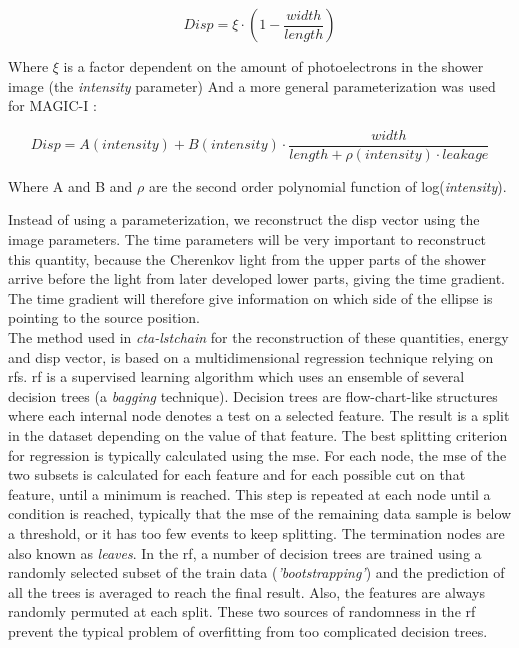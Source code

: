 \documentclass[main.tex]{subfiles}
\begin{document}
\begin{equation}
  Disp = \xi \cdot \left(1 - \frac{width}{length}  \right)
\end{equation}

Where $\xi$ is a factor dependent on the amount of photoelectrons in the shower image (the \textit{intensity} parameter)
And a more general parameterization was used for MAGIC-I \cite{2005DISPmagic}:

\begin{equation}
 Disp=A(intensity) + B(intensity) \cdot \frac{width}{length+\rho(intensity) \cdot leakage}  
\end{equation}

Where A and B and $\rho$ are the second order polynomial function of log(\textit{intensity}).

Instead of using a parameterization, we reconstruct the disp vector using the image parameters. The time parameters will be very important to reconstruct this quantity, because the Cherenkov light from the upper parts of the shower arrive before the light from later developed lower parts, giving the time gradient. The time gradient will therefore give information on which side of the ellipse is pointing to the source position.\\

The method used in \textit{cta-lstchain} for the reconstruction of these quantities, energy and disp vector, is based on a multidimensional regression technique relying on \glspl{rf}. \gls{rf} is a supervised learning algorithm which uses an ensemble of several decision trees (a \textit{bagging} technique). Decision trees are flow-chart-like structures where each internal node denotes a test on a selected feature. The result is a split in the dataset depending on the value of that feature. The best splitting criterion for regression is typically calculated using the \gls{mse}. For each node, the \gls{mse} of the two subsets is calculated for each feature and for each possible cut on that feature, until a minimum is reached. This step is repeated at each node until a condition is reached, typically that the \gls{mse} of the remaining data sample is below a threshold, or it has too few events to keep splitting. The termination nodes are also known as \textit{leaves}.
In the \gls{rf}, a number of decision trees are trained using a randomly selected subset of the train data (\textit{'bootstrapping'}) and the prediction of all the trees is averaged to reach the final result. Also, the features are always randomly permuted at each split. These two sources of randomness in the \gls{rf} prevent the typical problem of overfitting from too complicated decision trees. 
\end{document}
